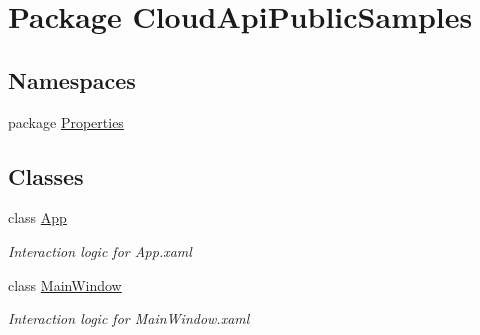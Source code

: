 \hypertarget{namespace_cloud_api_public_samples}{\section{Package Cloud\-Api\-Public\-Samples}
\label{namespace_cloud_api_public_samples}
}
\subsection*{Namespaces}
\begin{DoxyCompactItemize}
\item 
package \hyperlink{namespace_cloud_api_public_samples_1_1_properties}{Properties}
\end{DoxyCompactItemize}
\subsection*{Classes}
\begin{DoxyCompactItemize}
\item 
class \hyperlink{class_cloud_api_public_samples_1_1_app}{App}
\begin{DoxyCompactList}\small\item\em Interaction logic for App.\-xaml \end{DoxyCompactList}\item 
class \hyperlink{class_cloud_api_public_samples_1_1_main_window}{Main\-Window}
\begin{DoxyCompactList}\small\item\em Interaction logic for Main\-Window.\-xaml \end{DoxyCompactList}\end{DoxyCompactItemize}
